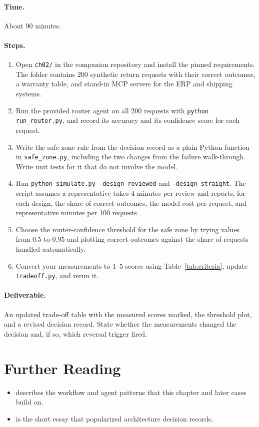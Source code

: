 \paragraph{Time.} About 90 minutes.

\paragraph{Steps.}
\begin{enumerate}[itemsep=2pt]
  \item Open \texttt{ch02/} in the companion repository and install the pinned requirements. The folder contains 200 synthetic return requests with their correct outcomes, a warranty table, and stand-in MCP servers for the ERP and shipping systems.
  \item Run the provided router agent on all 200 requests with \texttt{python run\_router.py}, and record its accuracy and its confidence score for each request.
  \item Write the safe-zone rule from the decision record as a plain Python function in \texttt{safe\_zone.py}, including the two changes from the failure walk-through. Write unit tests for it that do not involve the model.
  \item Run \texttt{python simulate.py --design reviewed} and \texttt{--design straight}. The script assumes a representative takes 4 minutes per review and reports, for each design, the share of correct outcomes, the model cost per request, and representative minutes per 100 requests.
  \item Choose the router-confidence threshold for the safe zone by trying values from 0.5 to 0.95 and plotting correct outcomes against the share of requests handled automatically.
  \item Convert your measurements to 1--5 scores using Table~\ref{tab:criteria}, update \texttt{tradeoff.py}, and rerun it.
\end{enumerate}

\paragraph{Deliverable.} An updated trade-off table with the measured scores marked, the threshold plot, and a revised decision record. State whether the measurements changed the decision and, if so, which reversal trigger fired.

\section*{Further Reading}

\begin{itemize}[itemsep=2pt]
  \item \citet{anthropic2024effective} describes the workflow and agent patterns that this chapter and later cases build on.
  \item \citet{nygard2011adr} is the short essay that popularized architecture decision records.
\end{itemize}
